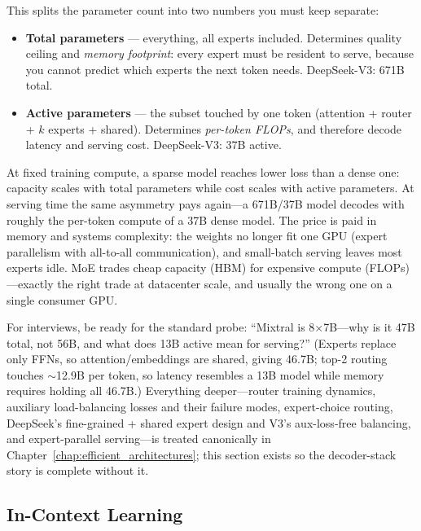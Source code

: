 This splits the parameter count into two numbers you must keep separate:
\begin{itemize}
    \item \textbf{Total parameters} --- everything, all experts included. Determines quality ceiling and \emph{memory footprint}: every expert must be resident to serve, because you cannot predict which experts the next token needs. DeepSeek-V3: 671B total.
    \item \textbf{Active parameters} --- the subset touched by one token (attention + router + $k$ experts + shared). Determines \emph{per-token FLOPs}, and therefore decode latency and serving cost. DeepSeek-V3: 37B active.
\end{itemize}

\begin{keyinsight}
At fixed training compute, a sparse model reaches lower loss than a dense one: capacity scales with total parameters while cost scales with active parameters. At serving time the same asymmetry pays again---a 671B/37B model decodes with roughly the per-token compute of a 37B dense model. The price is paid in memory and systems complexity: the weights no longer fit one GPU (expert parallelism with all-to-all communication), and small-batch serving leaves most experts idle. MoE trades cheap capacity (HBM) for expensive compute (FLOPs)---exactly the right trade at datacenter scale, and usually the wrong one on a single consumer GPU.
\end{keyinsight}

For interviews, be ready for the standard probe: ``Mixtral is 8$\times$7B---why is it 47B total, not 56B, and what does 13B active mean for serving?'' (Experts replace only FFNs, so attention/embeddings are shared, giving 46.7B; top-2 routing touches $\sim$12.9B per token, so latency resembles a 13B model while memory requires holding all 46.7B.) Everything deeper---router training dynamics, auxiliary load-balancing losses and their failure modes, expert-choice routing, DeepSeek's fine-grained + shared expert design and V3's aux-loss-free balancing, and expert-parallel serving---is treated canonically in Chapter~\ref{chap:efficient_architectures}; this section exists so the decoder-stack story is complete without it.

\subsection{In-Context Learning}

